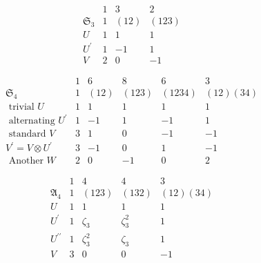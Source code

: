 \documentclass[12pt, oneside]{book}
\begin{document}
\chapter{}
\begin{example}
    \begin{equation*}
        \begin{array}{r|ccc}
                           & 1 & 3    & 2     \\
            \mathfrak{S}_3 & 1 & (12) & (123) \\
            \hline  U      & 1 & 1    & 1     \\
            U^{\prime}     & 1 & -1   & 1     \\
            V              & 2 & 0    & -1
        \end{array}
    \end{equation*}
\end{example}

\begin{example}
    \begin{equation*}
        \begin{array}{r|ccccc}
                                             & 1 & 6    & 8     & 6      & 3        \\
            \mathfrak{S}_4                   & 1 & (12) & (123) & (1234) & (12)(34) \\
            \hline
            \text { trivial } U              & 1 & 1    & 1     & 1      & 1        \\
            \text { alternating } U^{\prime} & 1 & -1   & 1     & -1     & 1        \\
            \text { standard } V             & 3 & 1    & 0     & -1     & -1       \\
            V^{\prime}=V \otimes U^{\prime}  & 3 & -1   & 0     & 1      & -1       \\
            \text { Another } W              & 2 & 0    & -1    & 0      & 2
        \end{array}
    \end{equation*}
\end{example}


\begin{example}
    \begin{equation*}
        \begin{array}{c|cccc}
                              & 1 & 4         & 4         & 3        \\
            \mathfrak{A}_4    & 1 & (123)     & (132)     & (12)(34) \\
            \hline U          & 1 & 1         & 1         & 1        \\
            U^{\prime}        & 1 & \zeta_3   & \zeta_3^2 & 1        \\
            U^{\prime \prime} & 1 & \zeta_3^2 & \zeta_3   & 1        \\
            V                 & 3 & 0         & 0         & -1
        \end{array}
    \end{equation*}
\end{example}
\end{document}

